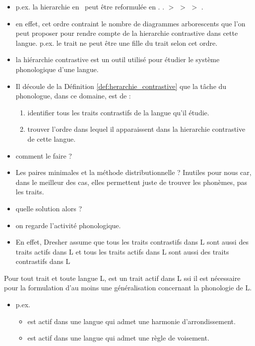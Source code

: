     \begin{itemize}
    	\item p.ex. la hierarchie en \Last\ peut \^etre reformul\'ee en \Next.
    	\ex.  $ > $  $ > $  $ > $ .
    	
    	\item en effet, cet ordre contraint le nombre de diagrammes arborescents que l'on peut proposer pour rendre compte de la hierarchie contrastive dans cette langue. p.ex. le trait  ne peut \^etre une fille du trait  selon cet ordre.  
    	\item la hi\'erarchie contrastive est un outil utilis\'e pour \'etudier le syst\`eme phonologique d'une langue.
    	\item Il d\'ecoule de la D\'efinition \ref{def:herarchie_contrastive} que la t\^ache du phonologue, dans ce domaine, est de :
    	\begin{enumerate}
    		\item identifier tous les traits contrastifs de la langue qu'il \'etudie.
    		\item trouver l'ordre dans lequel il apparaissent dans la hierarchie contrastive de cette langue.
    	\end{enumerate}
        \item comment le faire ?
        \item Les paires minimales et la m\'ethode distributionnelle ? 
        Inutiles pour nous car, dans le meilleur des cas, elles permettent juste de trouver les phon\`emes, pas les traits. 
        \item quelle solution alors ?
        \item on regarde l'activit\'e phonologique.
        \item En effet, Dresher assume que tous les traits contrastifs dans L sont aussi des traits actifs dans L et tous les traits actifs dans L sont aussi des traits contrastifs dans L
         
    \end{itemize}
    	
    \begin{defin}\label{def:trait actif}
    	Pour tout trait  et toute langue L,  est un trait actif dans L ssi il est n\'ecessaire pour la formulation d'au moins une g\'en\'eralisation concernant la phonologie de L.
    \end{defin}
    \begin{itemize}
    	\item p.ex.
    	\begin{itemize}
    		\item {} est actif dans une langue qui admet une harmonie d'arrondissement.
    		\item {} est actif dans une langue qui admet une r\`egle de voisement.
    	\end{itemize}
    \end{itemize}
    
